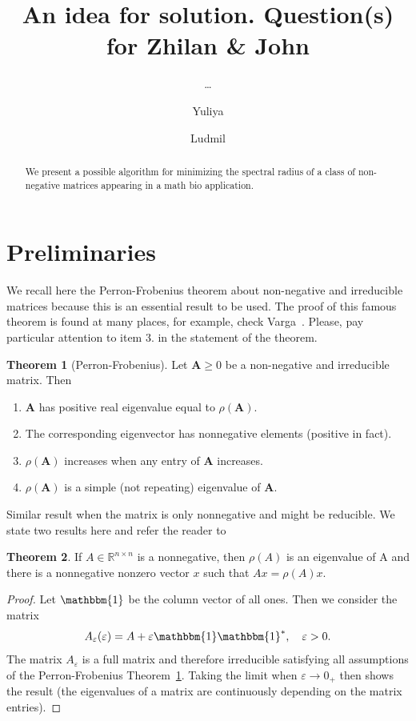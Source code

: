 \documentclass[12pt]{amsart}
\title{An idea for solution. Question(s) for Zhilan \& John}
\author{\ldots \and Yuliya \and Ludmil}
\theoremstyle{definition}
\newtheorem{theorem}{Theorem}[section]
\begin{document}
\maketitle

\begin{abstract}
We present a possible algorithm for minimizing the spectral radius of a class of non-negative matrices appearing in a math bio application. 
\end{abstract}

\section{Preliminaries}

We recall here the Perron-Frobenius theorem about non-negative and irreducible matrices because this is an essential result to be used. The proof of this famous theorem is found at many places, for example, check Varga~\cite[Theorem 2.7]{2000Varga-aa}. Please, pay particular attention to item 3. in the statement of the theorem. 
\begin{theorem}[Perron-Frobenius]\label{pf}
  Let $\bm A\geq 0$ be a non-negative and irreducible matrix. Then
  \begin{enumerate}
  \item $\bm A$ has positive real eigenvalue equal to $\rho(\bm A)$.
  \item The corresponding eigenvector has nonnegative elements (positive in fact).
  \item $\rho(\bm A)$ increases when any entry of $\bm A$ increases.
  \item $\rho(\bm A)$ is a simple (not repeating) eigenvalue of $\bm A$.
  \end{enumerate}
\end{theorem}

{\color{magenta} Similar result when the matrix is only nonnegative and might be reducible. We state two results here and refer the reader to~\cite[Section 8.3]{1985Horn_Johnson}
}
\begin{theorem}\label{reducible}
If $A\in \mathbb{R}^{n\times n}$ is a nonnegative, then $\rho(A)$ is an eigenvalue of A and there 
is a nonnegative nonzero vector $x$ such that $Ax=\rho(A)x$.
\end{theorem}
\begin{proof}\cite[Theorem 8.3.1]{1985Horn_Johnson}
Let $\mathbbm{1}$ be the column vector of all ones. Then we consider the matrix 
\[
A_{\varepsilon}(\varepsilon)=A+\varepsilon \mathbbm{1}\mathbbm{1}^*, \quad \varepsilon>0.
\]
The matrix $A_{\varepsilon}$ is a full matrix and therefore irreducible satisfying all assumptions of the Perron-Frobenius Theorem~\ref{pf}. Taking the limit when $\varepsilon\to 0_+$ then shows the result (the eigenvalues of a matrix are continuously depending on the matrix entries). 
\end{proof}
\end{document}

